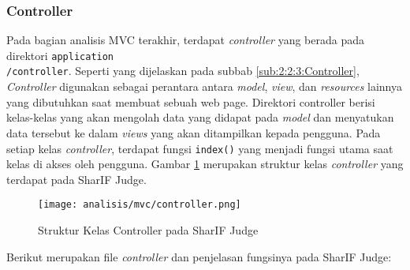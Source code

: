 \subsubsection{Controller}
\label{sub:3:1:1:controller}

Pada bagian analisis MVC terakhir, terdapat \textit{controller} yang berada pada direktori \verb|application|\\\verb|/controller|. Seperti yang dijelaskan pada subbab \ref{sub:2:2:3:Controller}, \textit{Controller} digunakan sebagai perantara antara \textit{model}, \textit{view}, dan \textit{resources} lainnya yang dibutuhkan saat membuat sebuah web page. Direktori controller berisi kelas-kelas yang akan mengolah data yang didapat pada \textit{model} dan menyatukan data tersebut ke dalam \textit{views} yang akan ditampilkan kepada pengguna. Pada setiap kelas \textit{controller}, terdapat fungsi \verb|index()| yang menjadi fungsi utama saat kelas di akses oleh pengguna.
Gambar \ref{fig:3:1:1:controller} merupakan struktur kelas \textit{controller} yang terdapat pada SharIF Judge.
\begin{figure}[H]
	\centering
	\texttt{[image: analisis/mvc/controller.png]}
	\caption{Struktur Kelas Controller pada SharIF Judge}
	\label{fig:3:1:1:controller}
\end{figure}

\newpage

Berikut merupakan file \textit{controller} dan penjelasan fungsinya pada SharIF Judge:

\vspace{0.5cm}

